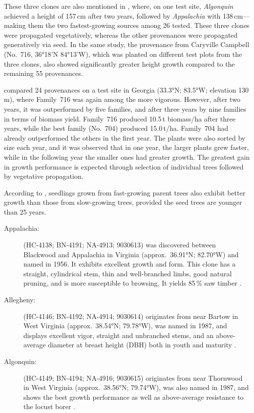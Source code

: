 These three clones are also mentioned in \citet{bridgen1988robinie}, where, on one test site, \emph{Algonquin} achieved a height of 157\,cm after two years, followed by \emph{Appalachia} with 138\,cm—making them the two fastest-growing sources among 26 tested. These three clones were propagated vegetatively, whereas the other provenances were propagated generatively via seed. In the same study, the provenance from Caryville Campbell (No.~716, 36°18'N 84°13'W), which was planted on different test plots from the three clones, also showed significantly greater height growth compared to the remaining 55 provenances.

\citet{bongarten1992robineSelektion} compared 24 provenances on a test site in Georgia (33.3°N; 83.5°W; elevation 130\,m), where Family~716 was again among the more vigorous. However, after two years, it was outperformed by five families, and after three years by nine families in terms of biomass yield. Family~716 produced 10.5\,t biomass/ha after three years, while the best family (No.~704) produced 15.0\,t/ha. Family~704 had already outperformed the others in the first year. The plants were also sorted by size each year, and it was observed that in one year, the larger plants grew faster, while in the following year the smaller ones had greater growth. The greatest gain in growth performance is expected through selection of individual trees followed by vegetative propagation.

According to \citet{cummings1947robinie}, seedlings grown from fast-growing parent trees also exhibit better growth than those from slow-growing trees, provided the seed trees are younger than 25 years.

\begin{description}
  \item[Appalachia:] (HC-4138; BN-4191; NA-4913; 9030613) was discovered between Blackwood and Appalachia in Virginia (approx.~36.91°N; 82.70°W) and named in 1956. It exhibits excellent growth and form. This clone has a straight, cylindrical stem, thin and well-branched limbs, good natural pruning, and is more susceptible to browsing. It yields 85\,\% saw timber \citep{steinergroup1987robinie,zsombor1980robinie,kapusi1995robinie}.
  
  \item[Allegheny:] (HC-4146; BN-4192; NA-4914; 9030614) originates from near Bartow in West Virginia (approx.~38.54°N; 79.78°W), was named in 1987, and displays excellent vigor, straight and unbranched stems, and an above-average diameter at breast height (DBH) both in youth and maturity \citep{steinergroup1987robinie}.
  
  \item[Algonquin:] (HC-4149; BN-4194; NA-4916; 9030615) originates from near Thornwood in West Virginia (approx.~38.56°N; 79.74°W), was also named in 1987, and shows the best growth performance as well as above-average resistance to the locust borer \citep{steinergroup1987robinie}.
\end{description}

